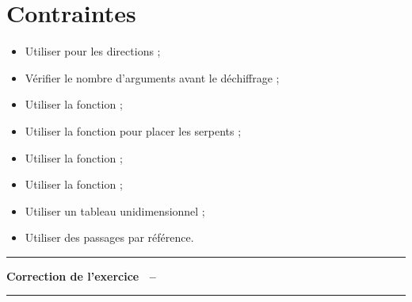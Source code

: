 \documentclass[a4paper]{article}
\newenvironment{Correction}{\par\tiny\blue\rule[1ex]{\textwidth}{1pt}\par\normalsize\textbf{\sffamily{}Correction de l'exercice~\theExo{} -- }}{\par\tiny\blue\rule[1ex]{\textwidth}{1pt}\par}
\begin{document}
	\section{Contraintes}
		\begin{itemize}
			\item Utiliser  pour les directions ;
			\item Vérifier le nombre d'arguments avant le déchiffrage ;
			\item Utiliser la fonction  ;
			\item Utiliser la fonction  pour placer les serpents ;
			\item Utiliser la fonction  ;
			\item Utiliser la fonction  ;
			\item Utiliser un tableau unidimensionnel ;
			\item Utiliser des passages par référence.
		\end{itemize}

		\begin{Correction}
		\end{Correction}
\end{document}
